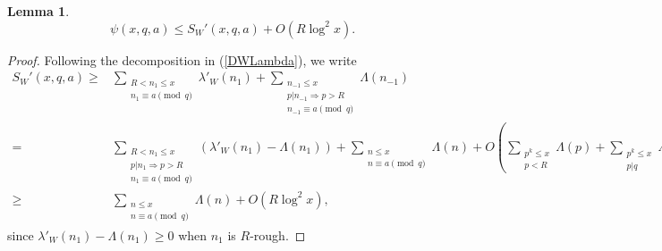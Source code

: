 \documentclass{amsart}
\newtheorem{lemma}[theorem]{Lemma}
\begin{document}
\begin{lemma}\label{psibd}
$$\psi(x,q,a)\leq S_W'(x,q,a)+O\left(R\log^2 x\right).$$
\end{lemma}
\begin{proof}
Following the decomposition in (\ref{DWLambda}), we write
\begin{align*}
S_W'(x,q,a)\geq &\sum_{\substack{R<n_1\leq x \\ n_1\equiv a\pmod q}}\lambda'_W\left(n_1\right)+\sum_{\substack{n_{-1}\leq x \\ p|n_{-1}\Rightarrow p>R \\ n_{-1}\equiv a\pmod q}}\Lambda\left(n_{-1}\right)\\
=&\sum_{\substack{R<n_1\leq x \\ p|n_1\Rightarrow p>R \\ n_1\equiv a\pmod q}}\left(\lambda'_W\left(n_1\right)-\Lambda\left(n_1\right)\right)+\sum_{\substack{n\leq x \\ n\equiv a\pmod q}}\Lambda\left(n\right)+O\left(\sum_{\substack{p^k\leq x\\ p<R }}\Lambda(p)+\sum_{\substack{p^k\leq x\\ p|q }}\Lambda(p)\right)\\
\geq &\sum_{\substack{n\leq x \\ n\equiv a\pmod q}}\Lambda\left(n\right)+O\left(R\log^2 x\right),
\end{align*}
since $\lambda'_W(n_1)-\Lambda(n_1)\geq 0$ when $n_1$ is $R$-rough.

\end{proof}
\end{document}
